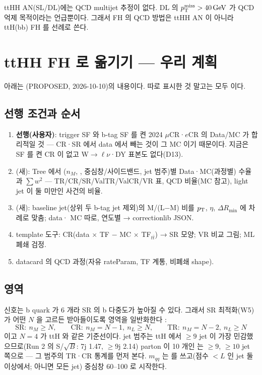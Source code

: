 \begin{andiff}[ttHH AN 과 다른 점]
ttHH AN(SL/DL)에는 QCD multijet 추정이 없다. DL 의 $p_{\mathrm{T}}^{\mathrm{miss}}>40\,\mathrm{GeV}$ 가 QCD 억제 목적이라는 언급뿐이다. 그래서 FH 의 QCD 방법은
ttHH AN 이 아니라 ttH(bb) FH 를 선례로 쓴다.
\end{andiff}

\section{ttHH FH 로 옮기기 — 우리 계획}\label{sec:qcd-plan}
아래는 (PROPOSED, 2026-10-10)의 내용이다. 따로 표시한 것 말고는 모두 \tagplan{} 이다.

\subsection{선행 조건과 순서}
\begin{enumerate}
\item \textbf{선행(사용자)}: trigger SF 와 b-tag SF 를 켠 2024 $\mu$CR·$e$CR 의 Data/MC 가 합리적일 것 — CR·SR 에서 data 에서 빼는 것이 그 MC 이기 때문이다.
      지금은 SF 를 켠 CR 이 없고 W$\to\ell\nu$·DY 표본도 없다(D13).
\item {}(새): Tree 에서 ($n_M$, ,  중심창/사이드밴드, jet 범주)별 Data·MC(과정별) 수율과
      $\sum w^2$ — TR/CR/SR/ValTR/ValCR/VR 표, QCD 비율(MC 참고), light jet 이 둘 미만인 사건의 비율.
\item {}(새): baseline jet(상위 두 b-tag jet 제외)의 M/(L$-$M) 비를 $p_{\mathrm{T}}$, $\eta$, $\Delta R_{\min}$ 에 차례로 맞춤; data·\ttbar{} MC
      따로, 연도별 → correctionlib JSON.
\item template 도구: CR(data $\times$ TF $-$ MC $\times$ TF$_{t\bar t}$) → SR 모양; VR 비교 그림; ML 폐쇄 검정.
\item datacard 의 QCD 과정(자유 rateParam, TF 계통, 비폐쇄 shape).
\end{enumerate}

\subsection{영역}
\ttHH{} 신호는 b quark 가 6 개라 SR 의 b 다중도가 높아질 수 있다. 그래서 SR 최적화(W5)가 어떤 $N$ 을 고르든 받아들이도록 영역을 일반화한다
:
\begin{equation}
\text{SR}:\ n_M\ge N,\qquad \text{CR}:\ n_M=N-1,\ n_L\ge N,\qquad \text{TR}:\ n_M=N-2,\ n_L\ge N
\label{eq:qcd-general}
\end{equation}
이고 $N=4$ 가 ttH 와 같은 기준선이다.
jet 범주는 ttH 에서 $\ge9$ jet 이 가장 민감했으므로(Run 2 의 S/$\sqrt{B}$: 7j 1.47, $\ge9$j 2.14) parton 이 10 개인 \ttHH{} 는
$\ge9$, $\ge10$ jet 쪽으로 — 그 범주의 TR·CR 통계를 먼저 본다. $m_{qq}$ 는  를 쓰고(점수 $<L$ 인 jet 둘 이상에서; 아니면 모든 jet) 중심창
60–100\GeV{} 로 시작한다.


